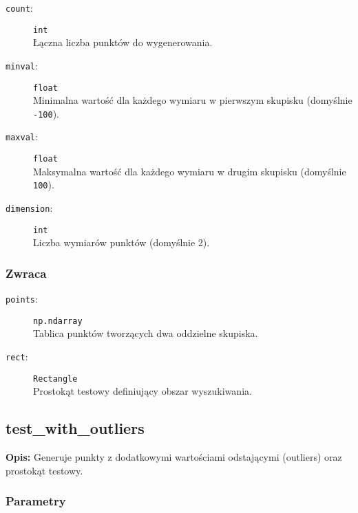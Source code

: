 \documentclass[12pt]{article}
\begin{document}
\begin{description}
    \item[\texttt{count}:] \texttt{int} \\
    Łączna liczba punktów do wygenerowania.
    
    \item[\texttt{minval}:] \texttt{float} \\
    Minimalna wartość dla każdego wymiaru w pierwszym skupisku (domyślnie \texttt{-100}).
    
    \item[\texttt{maxval}:] \texttt{float} \\
    Maksymalna wartość dla każdego wymiaru w drugim skupisku (domyślnie \texttt{100}).
    
    \item[\texttt{dimension}:] \texttt{int} \\
    Liczba wymiarów punktów (domyślnie 2).
\end{description}

\subsubsection{Zwraca}

\begin{description}
    \item[\texttt{points}:] \texttt{np.ndarray} \\
    Tablica punktów tworzących dwa oddzielne skupiska.
    
    \item[\texttt{rect}:] \texttt{Rectangle} \\
    Prostokąt testowy definiujący obszar wyszukiwania.
\end{description}

\subsection{test\_with\_outliers}

\textbf{Opis:} Generuje punkty z dodatkowymi wartościami odstającymi (outliers) oraz prostokąt testowy.

\subsubsection{Parametry}
\end{document}
